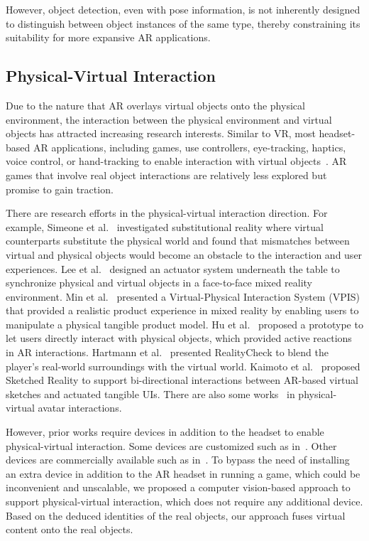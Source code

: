However, object detection, even with pose information, is not inherently designed to distinguish between object instances of the same type, thereby constraining its suitability for more expansive AR applications.

\subsection{Physical-Virtual Interaction}
Due to the nature that AR overlays virtual objects onto the physical environment, the interaction between the physical environment and virtual objects has attracted increasing research interests. Similar to VR, most headset-based AR applications, including games, use controllers, eye-tracking, haptics, voice control, or hand-tracking to enable interaction with virtual objects~\cite{balakrishnan2021interaction}. AR games that involve real object interactions are relatively less explored but promise to gain traction.%

There are research efforts in the physical-virtual interaction direction. For example, Simeone et al.~\cite{simeone2015substitutional} investigated substitutional reality where virtual counterparts substitute the physical world and found that mismatches between virtual and physical objects would become an obstacle to the interaction and user experiences. Lee et al.~\cite{lee2019mixed} designed an actuator system underneath the table to synchronize physical and virtual objects in a face-to-face mixed reality environment. Min et al.~\cite{min2018virtual} presented a Virtual-Physical Interaction System (VPIS) that provided a realistic product experience in mixed reality by enabling users to manipulate a physical tangible product model. Hu et al.~\cite{hu2020enhancing} proposed a prototype to let users directly interact with physical objects, which provided active reactions in AR interactions. Hartmann et al.~\cite{hartmann2019realitycheck} presented RealityCheck to blend the player's real-world surroundings with the virtual world. Kaimoto et al.~\cite{kaimoto2022sketched} proposed Sketched Reality to support bi-directional interactions between AR-based virtual sketches and actuated tangible UIs. There are also some works~\cite{nagendran2012continuum, kim2018improving} in physical-virtual avatar interactions.

However, prior works require devices in addition to the headset to enable physical-virtual interaction. Some devices are customized such as in~\cite{lee2019mixed, hu2020enhancing}. Other devices are commercially available such as in~\cite{min2018virtual, hartmann2019realitycheck, kaimoto2022sketched}. To bypass the need of installing an extra device in addition to the AR headset in running a game, which could be inconvenient and unscalable, we proposed a computer vision-based approach to support physical-virtual interaction, which does not require any additional device. Based on the deduced identities of the real objects, our approach fuses virtual content onto the real objects. 

